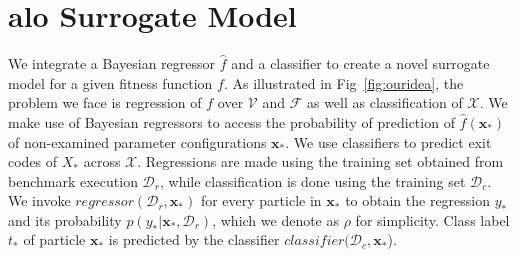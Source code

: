 \documentclass[10pt,conference,a4paper]{IEEEtran}
\begin{document}
\section{\ac{alo} Surrogate Model}
\label{surrogatemodels}

%
We integrate a Bayesian regressor $\hat{f}$ and a classifier to create a novel surrogate model for a given fitness function $f$. As illustrated in Fig~\ref{fig:ouridea}, the problem we face is regression of $f$ over $\mathcal{V}$ and $\mathcal{F}$ as well as classification of $\mathcal{X}$. We make use of Bayesian regressors to access the probability of prediction of $\hat{f}(\mathbf{x_*})$ of non-examined parameter configurations $\mathbf{x_*}$. We use classifiers to predict exit codes of $X_*$ across $\mathcal{X}$. Regressions are made using the training set obtained from benchmark execution $\mathcal{D}_{r}$, while classification is done using the training set $\mathcal{D}_{c}$. We invoke $regressor(\mathcal{D}_{r},\mathbf{x_*})$ for every particle in $\mathbf{x_*}$ to obtain the regression $y_*$ and its probability $p(y_* | \mathbf{x_*},\mathcal{D}_{r})$, which we denote as $\rho$ for simplicity. Class label $t_*$ of particle $\mathbf{x_*}$ is predicted by the classifier $classifier(\mathcal{D}_{c},\mathbf{x_*}$). 


%
\end{document}

